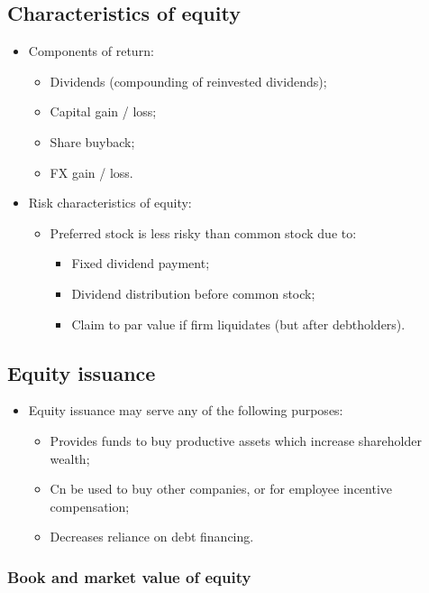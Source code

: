\documentclass[../notes_compiled.tex]{subfiles}
\begin{document}
\subsection{Characteristics of equity}
\begin{itemize}
\item Components of return:
\begin{itemize}
\item Dividends (compounding of reinvested dividends);
\item Capital gain / loss;
\item Share buyback;
\item FX gain / loss.
\end{itemize}
\item Risk characteristics of equity:
\begin{itemize}
\item Preferred stock is less risky than common stock due to:
\begin{itemize}
\item Fixed dividend payment;
\item Dividend distribution before common stock;
\item Claim to par value if firm liquidates (but after debtholders).
\end{itemize}
\end{itemize}
\end{itemize}

\subsection{Equity issuance}
\begin{itemize}
\item Equity issuance may serve any of the following purposes:
\begin{itemize}
\item Provides funds to buy productive assets which increase shareholder wealth;
\item Cn be used to buy other companies, or for employee incentive compensation;
\item Decreases reliance on debt financing.
\end{itemize}
\end{itemize}

\subsubsection{Book and market value of equity}
\end{document}
